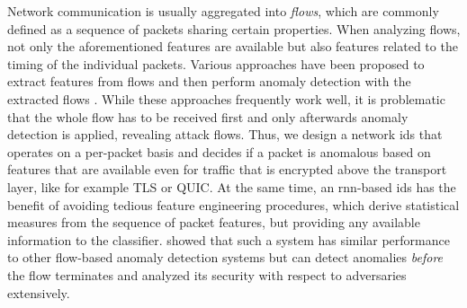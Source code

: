 \documentclass[conference]{IEEEtran}
\begin{document}
Network communication is usually aggregated into \textit{flows}, which are commonly defined as a sequence of packets sharing certain properties. When analyzing flows, not only the aforementioned features are available but also features related to the timing of the individual packets. Various approaches have been proposed to extract features from flows and then perform anomaly detection with the extracted flows \cite{meghdouri_analysis_2018}.
While these approaches frequently work well, it is problematic that the whole flow has to be received first and only afterwards anomaly detection is applied, revealing attack flows. Thus, we design a network \gls{ids} that operates on a per-packet basis and decides if a packet is anomalous based on features that are available even for traffic that is encrypted above the transport layer, like for example TLS or QUIC.
At the same time, an \gls{rnn}-based \gls{ids} has the benefit of avoiding tedious feature engineering procedures, which derive statistical measures from the sequence of packet features, but providing any available information to the classifier.
\cite{hartl_explainability_2019} showed that such a system has similar performance to other flow-based anomaly detection systems but can detect anomalies \textit{before} the flow terminates and analyzed its security with respect to adversaries extensively. 

\end{document}
